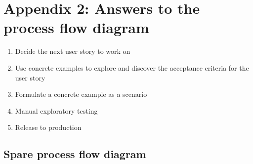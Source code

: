 \ifcontent

    \chapter*{Appendix 2: Answers to the process flow diagram}
    
    \begin{enumerate}
        \item Decide the next user story to work on
        \item Use concrete examples to explore and discover the acceptance criteria for the user story
        \item Formulate a concrete example as a scenario
        \item Manual exploratory testing
        \item Release to production
    \end{enumerate}
    
    \section*{Spare process flow diagram}
    

\fi 